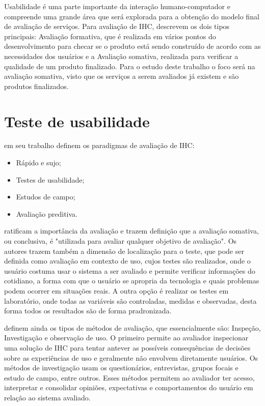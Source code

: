 Usabilidade é uma parte importante da interação humano-computador e compreende uma grande área que será explorada para a obtenção do modelo final de avaliação de serviços. Para avaliação de IHC, \cite{preece2005} descrevem os dois tipos principais: Avaliação formativa, que é realizada em vários pontos do desenvolvimento para checar se o produto está sendo construído de acordo com as necessidades dos usuários e a Avaliação somativa, realizada para verificar a qualidade de um produto finalizado. Para o estudo deste trabalho o foco será na avaliação somativa, visto que os serviços a serem avaliados já existem e são produtos finalizados.

\section{Teste de usabilidade}

\cite{preece2005} em seu trabalho definem os paradigmas de avaliação de IHC:
\begin{itemize}
	\item Rápido e sujo;
	\item Testes de usabilidade;
	\item Estudos de campo;
	\item Avaliação preditiva.
\end{itemize}

\cite{diniz2010} ratificam a importância da avaliação e trazem definição que a avaliação somativa, ou conclusiva, é "utilizada para avaliar qualquer objetivo de avaliação". Os autores trazem também a dimensão de localização para o teste, que pode ser definida como avaliação em contexto de uso, cujos testes são realizados, onde o usuário costuma usar o sistema a ser avaliado e permite verificar informações do cotidiano, a forma com que o usuário se apropria da tecnologia e quais problemas podem ocorrer em situações reais. A outra opção é realizar os testes em laboratório, onde todas as variáveis são controladas, medidas e observadas, desta forma todos os resultados são de forma pradronizada.

\cite{diniz2010} definem ainda os tipos de métodos de avaliação, que essencialmente são: Inspeção, Investigação e observação de uso. O primeiro permite ao avaliador inspecionar uma solução de IHC para tentar antever as possíveis consequências de decisões sobre as experiências de uso e geralmente não envolvem diretamente usuários.
Os métodos de investigação usam os questionários, entrevistas, grupos focais e estudo de campo, entre outros. Esses métodos permitem ao avaliador ter acesso, interpretar e consolidar opiniões, expectativas e comportamentos do usuário em relação ao sistema avaliado.

